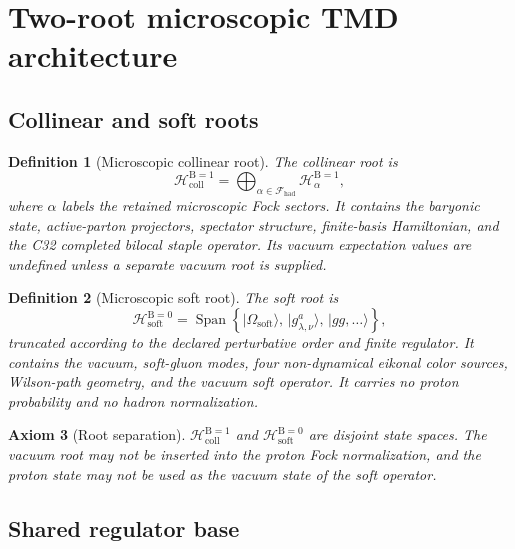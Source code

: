 \documentclass[11pt]{article}
\newtheorem{definition}{Definition}[section]
\newtheorem{axiom}[definition]{Axiom}
\newcommand{\Span}{\operatorname{Span}}
\newcommand{\cF}{\mathcal F}
\newcommand{\cH}{\mathcal H}
\newcommand{\Coll}{\ensuremath{\mathrm{coll}}}
\newcommand{\Soft}{\ensuremath{\mathrm{soft}}}
\newcommand{\Bnum}{\mathrm B}
\begin{document}
\section{Two-root microscopic TMD architecture}
\label{sec:two-root}

\subsection{Collinear and soft roots}

\begin{definition}[Microscopic collinear root]
The collinear root is
\begin{equation}
 \cH_{\Coll}^{\Bnum=1}
 =
 \bigoplus_{\alpha\in\cF_{\mathrm{had}}}
 \cH_{\alpha}^{\Bnum=1},
 \label{eq:coll-root}
\end{equation}
where \(\alpha\) labels the retained microscopic Fock sectors.  It contains the baryonic state, active-parton projectors, spectator structure, finite-basis Hamiltonian, and the C32 completed bilocal staple operator.  Its vacuum expectation values are undefined unless a separate vacuum root is supplied.
\end{definition}

\begin{definition}[Microscopic soft root]
The soft root is
\begin{equation}
 \cH_{\Soft}^{\Bnum=0}
 =
 \Span\left\{
 |\Omega_{\Soft}\rangle,\,
 |g^a_{\lambda,\nu}\rangle,\,
 |gg,\ldots\rangle
 \right\},
 \label{eq:soft-root}
\end{equation}
truncated according to the declared perturbative order and finite regulator.  It contains the vacuum, soft-gluon modes, four non-dynamical eikonal color sources, Wilson-path geometry, and the vacuum soft operator.  It carries no proton probability and no hadron normalization.
\end{definition}

\begin{axiom}[Root separation]
\label{ax:root-separation}
\(\cH_{\Coll}^{\Bnum=1}\) and \(\cH_{\Soft}^{\Bnum=0}\) are disjoint state spaces.  The vacuum root may not be inserted into the proton Fock normalization, and the proton state may not be used as the vacuum state of the soft operator.
\end{axiom}

\subsection{Shared regulator base}
\end{document}
